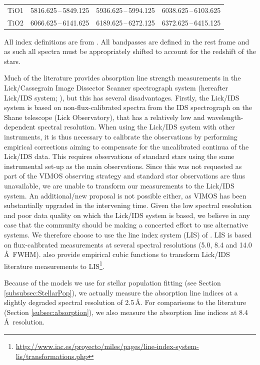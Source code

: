 \begin{table}
\begin{threeparttable}
\begin{tabular}{l c c c}
					TiO1 	& 5816.625\,--\,5849.125 & 5936.625\,--\,5994.125 & 6038.625\,--\,6103.625 \\
					TiO2 	& 6066.625\,--\,6141.625 & 6189.625\,--\,6272.125 & 6372.625\,--\,6415.125 \\
					\hline
					\hline
				\end{tabular}
				\begin{tablenotes}
				\footnotesize
				\note All index definitions are from \citet{Trager1998}. All bandpasses are defined in the rest frame and as such all spectra must be appropriately shifted to account for the redshift of the stars. 
				\end{tablenotes}
			\end{threeparttable}
			\end{table}

			Much of the literature provides absorption line strength measurements in the Lick/Cassegrain Image Dissector Scanner spectrograph system (hereafter Lick/IDS system; \citealt{Faber1985, Worthey1994}), but this has several disadvantages. Firstly, the Lick/IDS system is based on non-flux-calibrated spectra from the IDS spectrograph on the Shane telescope (Lick Observatory), that has a relatively low and wavelength-dependent spectral resolution. When using the Lick/IDS system with other instruments, it is thus necessary to calibrate the observations by performing empirical corrections aiming to compensate for the uncalibrated continua of the Lick/IDS data. This requires observations of standard stars using the same instrumental set-up as the main observations. Since this was not requested as part of the VIMOS observing strategy and standard star observations are thus unavailable, we are unable to transform our measurements to the Lick/IDS system. An additional/new proposal is not possible either, as VIMOS has been substantially upgraded in the intervening time. Given the low spectral resolution and poor data quality on which the Lick/IDS system is based, we believe in any case that the community should be making a concerted effort to use alternative systems. We therefore choose to use the line index system (LIS) of \citet{Vazdekis2010}. LIS is based on flux-calibrated measurements at several spectral resolutions (5.0, 8.4 and 14.0\,\AA\ FWHM). \citet{Vazdekis2010} also provide empirical cubic functions to transform Lick/IDS literature measurements to LIS\footnote{\url{http://www.iac.es/proyecto/miles/pages/line-index-system-lis/transformations.php}}.

			Because of the models we use for stellar population fitting (see Section \ref{subsubsec:StellarPop}), we actually measure the absorption line indices at a slightly degraded spectral resolution of 2.5\,\AA. For comparisons to the literature (Section \ref{subsec:absorption}), we also measure the absorption line indices at 8.4\,\AA\ resolution. 


